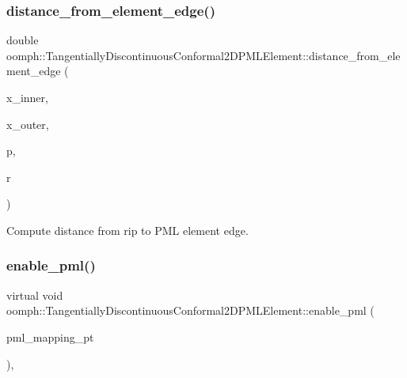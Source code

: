 \subsubsection{\texorpdfstring{distance\+\_\+from\+\_\+element\+\_\+edge()}{distance\_from\_element\_edge()}}
{\footnotesize\ttfamily double oomph\+::\+Tangentially\+Discontinuous\+Conformal2\+D\+P\+M\+L\+Element\+::distance\+\_\+from\+\_\+element\+\_\+edge (\begin{DoxyParamCaption}\item[{const \hyperlink{classoomph_1_1Vector}{Vector}$<$ double $>$ \&}]{x\+\_\+inner,  }\item[{const \hyperlink{classoomph_1_1Vector}{Vector}$<$ double $>$ \&}]{x\+\_\+outer,  }\item[{const \hyperlink{classoomph_1_1Vector}{Vector}$<$ double $>$ \&}]{p,  }\item[{const \hyperlink{classoomph_1_1Vector}{Vector}$<$ double $>$ \&}]{r }\end{DoxyParamCaption})}



Compute distance from rip to P\+ML element edge. 

\mbox{\label{classoomph_1_1TangentiallyDiscontinuousConformal2DPMLElement_a656d6b337a04f9b889637f0cbbcf209b}} 
\subsubsection{\texorpdfstring{enable\+\_\+pml()}{enable\_pml()}}
{\footnotesize\ttfamily virtual void oomph\+::\+Tangentially\+Discontinuous\+Conformal2\+D\+P\+M\+L\+Element\+::enable\+\_\+pml (\begin{DoxyParamCaption}\item[{\hyperlink{classoomph_1_1TangentiallyDiscontinuousConformalPMLMapping}{Tangentially\+Discontinuous\+Conformal\+P\+M\+L\+Mapping} $\ast$}]{pml\+\_\+mapping\+\_\+pt }\end{DoxyParamCaption})\hspace{0.3cm}{\ttfamily [inline]}, {\ttfamily [virtual]}}



